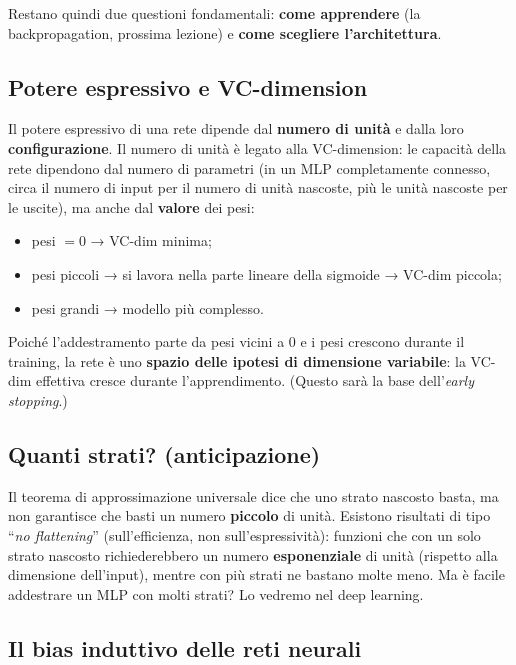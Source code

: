 Restano quindi due questioni fondamentali: \textbf{come apprendere} (la
backpropagation, prossima lezione) e \textbf{come scegliere
l'architettura}.

\subsection{Potere espressivo e
VC-dimension}\label{potere-espressivo-e-vc-dimension}

Il potere espressivo di una rete dipende dal \textbf{numero di unità} e
dalla loro \textbf{configurazione}. Il numero di unità è legato alla
VC-dimension: le capacità della rete dipendono dal numero di parametri
(in un MLP completamente connesso, circa il numero di input per il
numero di unità nascoste, più le unità nascoste per le uscite), ma anche
dal \textbf{valore} dei pesi:

\begin{itemize}
\tightlist
\item
  pesi \(= 0\) → VC-dim minima;
\item
  pesi piccoli → si lavora nella parte lineare della sigmoide → VC-dim
  piccola;
\item
  pesi grandi → modello più complesso.
\end{itemize}

Poiché l'addestramento parte da pesi vicini a 0 e i pesi crescono
durante il training, la rete è uno \textbf{spazio delle ipotesi di
dimensione variabile}: la VC-dim effettiva cresce durante
l'apprendimento. (Questo sarà la base dell'\emph{early stopping}.)

\subsection{Quanti strati?
(anticipazione)}\label{quanti-strati-anticipazione}

Il teorema di approssimazione universale dice che uno strato nascosto
basta, ma non garantisce che basti un numero \textbf{piccolo} di unità.
Esistono risultati di tipo ``\emph{no flattening}'' (sull'efficienza,
non sull'espressività): funzioni che con un solo strato nascosto
richiederebbero un numero \textbf{esponenziale} di unità (rispetto alla
dimensione dell'input), mentre con più strati ne bastano molte meno. Ma
è facile addestrare un MLP con molti strati? Lo vedremo nel deep
learning.

\subsection{Il bias induttivo delle reti
neurali}\label{il-bias-induttivo-delle-reti-neurali}

